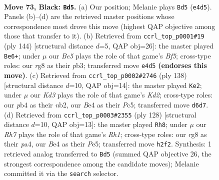 \documentclass[11pt]{article}
\begin{document}
\clearpage

\begin{figure}[p]\centering
\begin{subfigure}{0.46\textwidth}\centering
\resizebox{\linewidth}{!}{%
\newchessgame
\chessboard[
  setfen={6R1/8/3k4/8/1P2b3/8/7r/3KR3 b - - 20 73},
  showmover=false,
  pgfstyle=straightmove, color=movearrow, markmove={e4-d5}
]}
\caption{}
\end{subfigure}\hfill
\begin{subfigure}{0.46\textwidth}\centering
\resizebox{\linewidth}{!}{%
\newchessgame
\chessboard[
  setfen={5rk1/R7/8/4KB2/8/1p6/8/8 w - - 0 73},
  showmover=false,
  pgfstyle=straightmove, color=movearrow, markmove={f5-e6}
]}
\caption{}
\end{subfigure}
\\[4pt]
\begin{subfigure}{0.46\textwidth}\centering
\resizebox{\linewidth}{!}{%
\newchessgame
\chessboard[
  setfen={8/5R2/k7/r1P5/8/8/1n1K4/8 w - - 12 70},
  showmover=false,
  pgfstyle=straightmove, color=movearrow, markmove={d2-e2}
]}
\caption{}
\end{subfigure}\hfill
\begin{subfigure}{0.46\textwidth}\centering
\resizebox{\linewidth}{!}{%
\newchessgame
\chessboard[
  setfen={8/3kr3/8/4P1K1/p7/8/8/7R w - - 17 65},
  showmover=false,
  pgfstyle=straightmove, color=movearrow, markmove={h1-h8}
]}
\caption{}
\end{subfigure}
\caption{\textbf{Move 73, Black: \texttt{Bd5}.} (a) Our position; Melanie plays \texttt{Bd5} (\texttt{e4d5}). Panels (b)--(d) are the retrieved master positions whose correspondence most drove this move (highest QAP objective among those that transfer to it). (b) Retrieved from \texttt{ccrl\_top\_p0001\#19} (ply 144) [structural distance $d$=5, QAP obj=26]: the master played \texttt{Be6+}; under $\mu$ our \emph{Be5} plays the role of that game's \emph{Bf5}; cross-type roles: our \emph{r}g8 as their \emph{p}b3; transferred move \texttt{e4d5} \textbf{(endorses this move)}. (c) Retrieved from \texttt{ccrl\_top\_p0002\#2746} (ply 138) [structural distance $d$=10, QAP obj=14]: the master played \texttt{Ke2}; under $\mu$ our \emph{Kd3} plays the role of that game's \emph{Kd2}; cross-type roles: our \emph{p}b4 as their \emph{n}b2, our \emph{B}e4 as their \emph{P}c5; transferred move \texttt{d6d7}. (d) Retrieved from \texttt{ccrl\_top\_p0003\#2355} (ply 128) [structural distance $d$=10, QAP obj=13]: the master played \texttt{Rh8}; under $\mu$ our \emph{Rh7} plays the role of that game's \emph{Rh1}; cross-type roles: our \emph{r}g8 as their \emph{p}a4, our \emph{B}e4 as their \emph{P}e5; transferred move \texttt{h2f2}. Synthesis: 1 retrieved analog transferred to \texttt{Bd5} (summed QAP objective 26, the strongest correspondence among the candidate moves); Melanie committed it via the \texttt{search} selector.}
\label{fig:thought-m145}
\end{figure}
\end{document}
